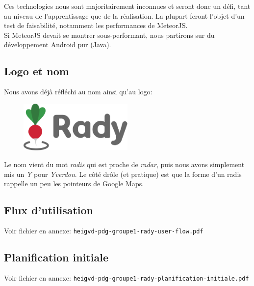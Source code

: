 \documentclass[french]{article}
\begin{document}
			Ces technologies nous sont majoritairement inconnues et seront donc un défi, tant au niveau de l'apprentissage que de la réalisation. La plupart feront l'objet d'un test de faisabilité, notamment les performances de MeteorJS.\\
			
			Si MeteorJS devait se montrer sous-performant, nous partirons sur du développement Android pur (Java).
			
		\subsection{Logo et nom}
			Nous avons déjà réfléchi au nom ainsi qu'au logo:
			\begin{figure}[H]
				\centering
				\includegraphics[width=0.5\textwidth]{../logo/logo}
			\end{figure}
			Le nom vient du mot \textit{radis} qui est proche de \textit{radar}, puis nous avons simplement mis un \textit{Y} pour \textit{Yverdon}. Le côté drôle (et pratique) est que la forme d'un radis rappelle un peu les pointeurs de Google Maps.
		
		\subsection{Flux d'utilisation}
		\label{subsec:userflow}
			Voir fichier en annexe: \texttt{heigvd-pdg-groupe1-rady-user-flow.pdf}
		
		\subsection{Planification initiale}
			Voir fichier en annexe: \texttt{heigvd-pdg-groupe1-rady-planification-initiale.pdf}
			
\end{document}
